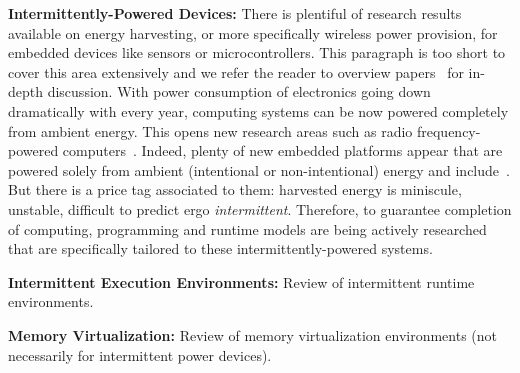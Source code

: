 \noindent \textbf{Intermittently-Powered Devices:} There is plentiful of research results available on energy harvesting, or more specifically wireless power provision, for embedded devices like sensors or microcontrollers. This paragraph is too short to cover this area extensively and we refer the reader to overview papers~\cite{prasad_comst_2014,sample_procieee_2013,huang:commag:2015,visser_procieee_2013,kamalinejad_commag_2015,ku_cst_2016} for in-depth discussion. With power consumption of electronics going down dramatically with every year, computing systems can be now powered completely from ambient energy. This opens new research areas such as radio frequency-powered computers~\cite{patel_pervasive_2017,rf_powered_computing_gollakota_2014}. Indeed, plenty of new embedded platforms appear that are powered solely from ambient (intentional or non-intentional) energy and include~\cite{wisp5,moo,zhao_rfid_2015,holleman_biocas_2008,thomas_jbcs_2012,naderiparizi_rfid_2015,rodriguez_tbcs_2015,liu_sigcomm_2013,kicksat,nadeau_naturebio_2017}. But there is a price tag associated to them: harvested energy is miniscule, unstable, difficult to predict ergo \emph{intermittent}. Therefore, to guarantee completion of computing, programming and runtime models are being actively researched that are specifically tailored to these intermittently-powered systems. 

\noindent \textbf{Intermittent Execution Environments:} Review of intermittent runtime environments. 

\noindent \textbf{Memory Virtualization:} Review of memory virtualization environments (not necessarily for intermittent power devices). 